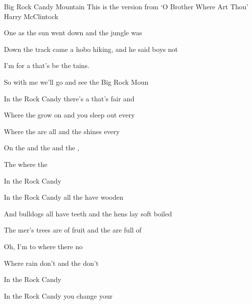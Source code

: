 \begin{SBSong}{Big Rock Candy Mountain}
  {This is the version from `O Brother Where Art Thou'}
  {Harry McClintock}
  \begin{SBVerse}
    One  as the sun went down and the jungle  was 
    
    Down the track came a hobo hiking, and he said boys \WBLineBrk{} not 
    
    I'm  for a  that's   
    be the  tains.
    
    So  with me we'll go and see the Big Rock  Moun
  \end{SBVerse}
  \begin{SBVerse}
    In the  Rock Candy  there's a  that's \WBLineBrk fair and 
    
    Where the  grow on  and you sleep out every  
    
    Where the  are all  and the  shines every 
    
    On the  and the  and the  ,
    
    The   where the  
    
    In the  Rock Candy 
  \end{SBVerse}
  \begin{SBVerse}
    In the  Rock Candy  all the  have wooden 
    
    And  bulldogs all have  teeth and the hens lay \WBLineBrk soft boiled  
    
    The mer's trees are  of fruit and the  are full of 
    
    Oh, I'm  to  where there  no 
    
    Where  rain don't  and the  don't 
    
    In the  Rock Candy 
  \end{SBVerse}
  \begin{SBVerse}
    In the  Rock Candy  you  change your 
    

\end{SBVerse}
\end{SBSong}
